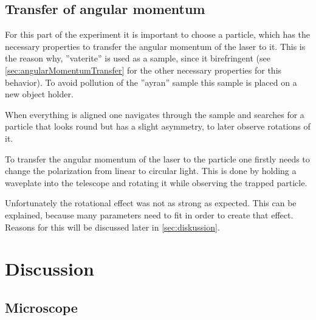 \documentclass[12pt,english]{scrartcl}
\begin{document}
\subsection{Transfer of angular momentum}\label{sec:AuswertungAngularMomentum}

For this part of the experiment it is important to choose a particle, which has
the necessary properties to transfer the angular momentum of the laser to it.
This is the reason why, ''vaterite'' is used as a sample, since it birefringent
(see \autoref{sec:angularMomentumTransfer} for the other necessary properties
for this behavior). To avoid pollution of the ''ayran'' sample this sample is
placed on a new object holder.

When everything is aligned one navigates through the sample and searches for a
particle that looks round but has a slight asymmetry, to later observe
rotations of it.

To transfer the angular momentum of the laser to the particle one firstly needs
to change the polarization from linear to circular light. This is done by
holding a waveplate into the telescope and rotating it while observing the
trapped particle.


Unfortunately the rotational effect was not as strong as expected. This can be
explained, because many parameters need to fit in order to create that effect.
Reasons for this will be discussed later in \autoref{sec:diskussion}.


\section{Discussion}\label{sec:diskussion}

\subsection{Microscope}
\end{document}
